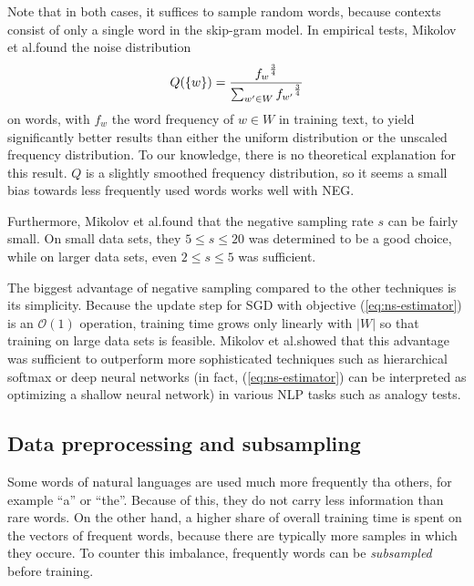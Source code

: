 \documentclass{amsart}
\theoremstyle{plain}
\theoremstyle{definition}
\begin{document}
Note that in both cases, it suffices to sample random words, because contexts consist of only a single word in the skip-gram model.
In empirical tests, Mikolov et al.\@ found the noise distribution
\begin{equation}
  \label{eq:noise-distribution}
  Q(\{w\}) = \frac{{f_w}^{3 \over 4}}{\sum_{w' \in W} {f_{w'}}^{3 \over 4}}
\end{equation}
on words, with $f_w$ the word frequency of $w \in W$ in training text, to yield significantly better results than either the uniform distribution or the unscaled frequency distribution.
To our knowledge, there is no theoretical explanation for this result.
$Q$ is a slightly smoothed frequency distribution, so it seems a small bias towards less frequently used words works well with NEG.

Furthermore, Mikolov et al.\@ found that the negative sampling rate $s$ can be fairly small.
On small data sets, they $5 \leq s \leq 20$ was determined to be a good choice, while on larger data sets, even $2 \leq s \leq 5$ was sufficient.

The biggest advantage of negative sampling compared to the other techniques is its simplicity.
Because the update step for SGD with objective (\ref{eq:ns-estimator}) is an $\mathcal{O}(1)$ operation, training time grows only linearly with $|W|$ so that training on large data sets is feasible.
Mikolov et al.\@ showed that this advantage was sufficient to outperform more sophisticated techniques such as hierarchical softmax or deep neural networks (in fact, (\ref{eq:ns-estimator}) can be interpreted as optimizing a shallow neural network) in various NLP tasks such as analogy tests.

\subsection{Data preprocessing and subsampling}
Some words of natural languages are used much more frequently tha others, for example ``a'' or ``the''.
Because of this, they do not carry less information than rare words.
On the other hand, a higher share of overall training time is spent on the vectors of frequent words, because there are typically more samples in which they occure.
To counter this imbalance, frequently words can be \emph{subsampled} before training.
\end{document}
